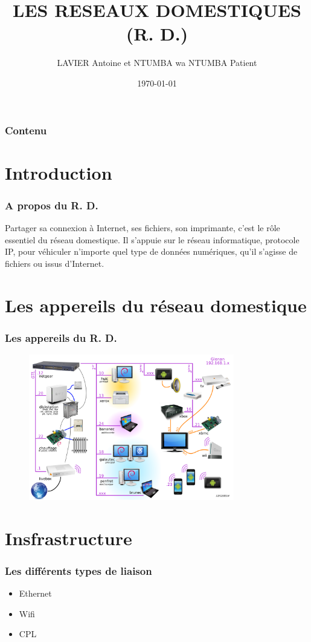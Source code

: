 \documentclass[handout]{beamer}
\begin{document}
\title{LES RESEAUX DOMESTIQUES (R. D.)}  
\author{LAVIER Antoine et NTUMBA wa NTUMBA Patient}
\date{\today} 

\begin{frame}
\titlepage
\end{frame} 

\begin{frame}
\frametitle{Contenu}
\tableofcontents
\end{frame} 




\section{Introduction}
\begin{frame}\frametitle{A propos du R. D.} 
Partager sa connexion à Internet, ses fichiers, son imprimante, c'est le rôle essentiel du réseau domestique. Il s'appuie sur le réseau informatique, protocole IP,  pour véhiculer n'importe quel type de données numériques, qu'il s'agisse de fichiers  ou issus d'Internet.
\end{frame}
\section{Les appereils du réseau domestique}
\begin{frame}\frametitle{Les appereils du R. D.} 
\begin{figure}
		\centering
		\includegraphics[width=0.8\textwidth,natwidth=100,natheight=100]{image/LAN6.png}
\end{figure}
\end{frame}

\section{Insfrastructure}
\begin{frame}\frametitle{Les différents types de liaison} 
\begin{itemize}
\item Ethernet
\item Wifi
\item CPL
\end{itemize}
\end{frame}
\end{document}
